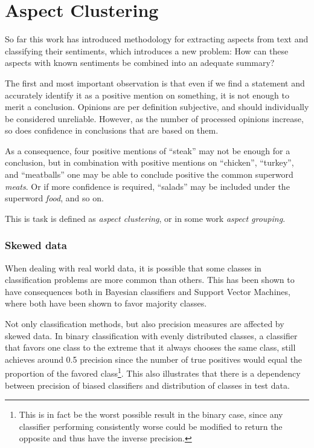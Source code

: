 \documentclass[a4paper,11pt]{kth-mag}
\begin{document}





\chapter{Aspect Clustering}
So far this work has introduced methodology for extracting aspects from text and classifying their sentiments, which introduces a new problem: How can these aspects with known sentiments be combined into an adequate summary?

The first and most important observation is that even if we find a statement and accurately identify it as a positive mention on something, it is not enough to merit a conclusion. Opinions are per definition subjective, and should individually be considered unreliable. However, as the number of processed opinions increase, so does confidence in conclusions that are based on them.

As a consequence, four positive mentions of ``steak'' may not be enough for a conclusion, but in combination with positive mentions on ``chicken'', ``turkey'',  and ``meatballs'' one may be able to conclude positive the common \gls{superword} \emph{meats}. Or if more confidence is required, ``salads'' may be included under the \gls{superword} \emph{food}, and so on.

This is task is defined as \emph{aspect clustering}, or in some work \emph{aspect grouping}.


\subsection{Skewed data}
\label{subsec:bias}
When dealing with real world data, it is possible that some classes in classification problems are more
common than others. This has been shown to have consequences both in Bayesian classifiers\cite{rennie2003bias}
and Support Vector Machines\cite{svm_bias}, where both have been shown to favor majority
classes\cite{rennie2003bias, svm_bias}.

Not only classification methods, but also precision measures are affected by skewed data. In binary
classification with evenly distributed classes, a classifier that favors one class to the extreme that it
always chooses the same class, still achieves around 0.5 precision since the number of true positives
would equal the proportion of the favored class\footnote{This is in fact be the worst possible result
in the binary case, since any classifier performing consistently worse could be modified to return the
opposite and thus have the inverse precision.}. This also illustrates that there is a dependency between
precision of biased classifiers and distribution of classes in test data.
\end{document}
